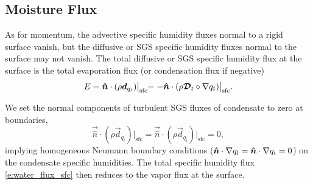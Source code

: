 \documentclass{report}
\begin{document}
\subsection{Moisture Flux}\label{s:bc_moisture_flux}

As for momentum, the advective specific humidity fluxes normal to a rigid surface vanish, but the diffusive or SGS specific humidity fluxes normal to the surface may not vanish.  The total diffusive or SGS specific humidity flux at the surface is the total evaporation flux (or condensation flux if negative)
\begin{equation}\label{e:water_flux_sfc}
E = \boldsymbol{{\hat n}} \cdot (\rho \boldsymbol{{d}}_{q_{t}})\bigl|_\mathrm{sfc} = -\boldsymbol{{\hat n}} \cdot (\rho \boldsymbol{{\mathcal{D}}}_t \circ \nabla q_t)\bigl|_\mathrm{sfc}.
\end{equation}

We set the normal components of turbulent SGS fluxes of condensate to zero at boundaries,
\begin{equation}\label{e:SGS_sfc_condensate_fluxes}
\vec{\hat n} \cdot (\rho \vec{d}_{q_{l}})\bigl|_\mathrm{sfc} = \vec{\hat n} \cdot (\rho \vec{d}_{q_{i}})\bigl|_\mathrm{sfc} = 0,
\end{equation}
implying homogeneous Neumann boundary conditions ($\boldsymbol{{\hat n}}\cdot\nabla q_l = \boldsymbol{{\hat n}}\cdot\nabla q_i = 0$) on the condensate specific humidities. The total specific humidity flux \eqref{e:water_flux_sfc} then reduces to the vapor flux at the surface. 
\end{document}
